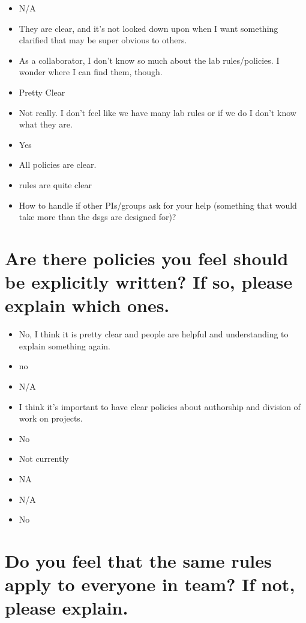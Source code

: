 \documentclass[
]{book}
\providecommand{\tightlist}{%
  \setlength{\itemsep}{0pt}\setlength{\parskip}{0pt}}
\begin{document}
\begin{itemize}
\tightlist
\item
  N/A
\item
  They are clear, and it's not looked down upon when I want something clarified that may be super obvious to others.
\item
  As a collaborator, I don't know so much about the lab rules/policies. I wonder where I can find them, though.
\item
  Pretty Clear
\item
  Not really. I don't feel like we have many lab rules or if we do I don't know what they are.
\item
  Yes
\item
  All policies are clear.
\item
  rules are quite clear
\item
  How to handle if other PIs/groups ask for your help (something that would take more than the dsgs are designed for)?
\end{itemize}

\hypertarget{are-there-policies-you-feel-should-be-explicitly-written-if-so-please-explain-which-ones.}{%
\section{Are there policies you feel should be explicitly written? If so, please explain which ones.}\label{are-there-policies-you-feel-should-be-explicitly-written-if-so-please-explain-which-ones.}}

\begin{itemize}
\tightlist
\item
  No, I think it is pretty clear and people are helpful and understanding to explain something again.
\item
  no
\item
  N/A
\item
  I think it's important to have clear policies about authorship and division of work on projects.
\item
  No
\item
  Not currently
\item
  NA
\item
  N/A
\item
  No
\end{itemize}

\hypertarget{do-you-feel-that-the-same-rules-apply-to-everyone-in-team-if-not-please-explain.}{%
\section{Do you feel that the same rules apply to everyone in team? If not, please explain.}\label{do-you-feel-that-the-same-rules-apply-to-everyone-in-team-if-not-please-explain.}}
\end{document}
